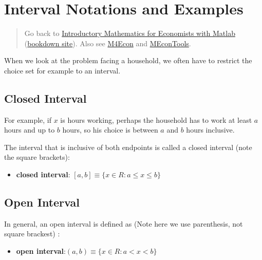 \documentclass[
]{book}
\providecommand{\tightlist}{%
  \setlength{\itemsep}{0pt}\setlength{\parskip}{0pt}}
\begin{document}
\vspace{1em}

\hypertarget{interval-notations-and-examples}{%
\section{Interval Notations and Examples}\label{interval-notations-and-examples}}

\begin{quote}
Go back to \href{https://math4econ.github.io/}{Introductory Mathematics for Economists with Matlab} (\href{https://math4econ.github.io/bookdown}{bookdown site}). Also see \href{http://fanwangecon.github.io/M4Econ}{M4Econ} and \href{https://fanwangecon.github.io/MEconTools/}{MEconTools}.
\end{quote}

When we look at the problem facing a household, we often have to
restrict the choice set for example to an interval.

\hypertarget{closed-interval}{%
\subsection{Closed Interval}\label{closed-interval}}

For example, if \(x\) is hours working, perhaps the household has to work
at least \(a\) hours and up to \(b\) hours, so his choice is between \(a\) and
\(b\) hours inclusive.

The interval that is inclusive of both endpoints is called a closed
interval (note the square brackets):

\begin{itemize}
\tightlist
\item
  \textbf{closed interval}:
  \(\left\lbrack a,b\right\rbrack \equiv \lbrace x\in R:a\le x\le b\rbrace\)
\end{itemize}

\hypertarget{open-interval}{%
\subsection{Open Interval}\label{open-interval}}

In general, an open interval is defined as (Note here we use
parenthesis, not square brackest) :

\begin{itemize}
\tightlist
\item
  \textbf{open
  interval}:\(\left(a,b\right)\equiv \lbrace x\in R:a<x<b\rbrace\)
\end{itemize}
\end{document}
